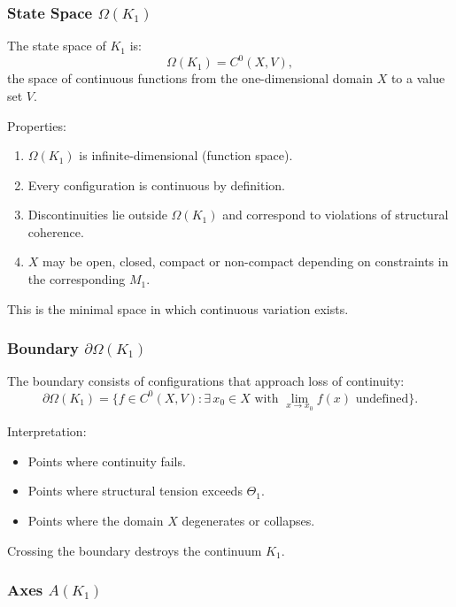 \subsubsection{State Space \texorpdfstring{$\Omega(K_1)$}{\Omega(K_1)}}

The state space of $K_1$ is:
\[
\Omega(K_1) = C^0(X, V),
\]
the space of continuous functions from the one-dimensional domain $X$
to a value set $V$.

Properties:
\begin{enumerate}
    \item $\Omega(K_1)$ is infinite-dimensional (function space).
    \item Every configuration is continuous by definition.
    \item Discontinuities lie outside $\Omega(K_1)$ and correspond to
          violations of structural coherence.
    \item $X$ may be open, closed, compact or non-compact depending on
          constraints in the corresponding $M_1$.
\end{enumerate}

This is the minimal space in which continuous variation exists.

\subsubsection{Boundary \texorpdfstring{$\partial\Omega(K_1)$}{\partial\Omega(K_1)}}

The boundary consists of configurations that approach loss of
continuity:
\[
\partial\Omega(K_1) =
\{ f \in C^0(X,V) : \exists\, x_0 \in X \text{ with }
\lim_{x \to x_0} f(x) \text{ undefined} \}.
\]

Interpretation:
\begin{itemize}
    \item Points where continuity fails.
    \item Points where structural tension exceeds $\Theta_1$.
    \item Points where the domain $X$ degenerates or collapses.
\end{itemize}

Crossing the boundary destroys the continuum $K_1$.

\subsubsection{Axes \texorpdfstring{$A(K_1)$}{A(K_1)}}

